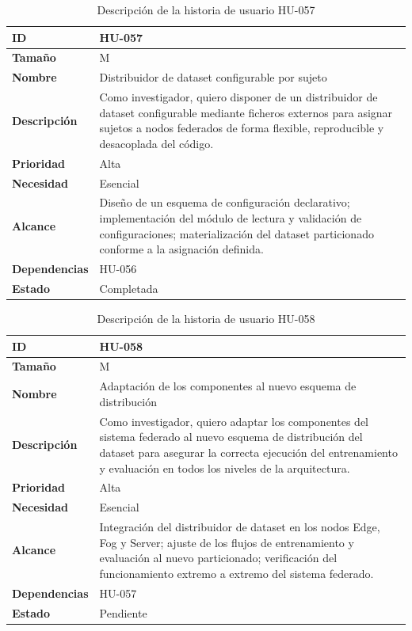 \documentclass{report}
\begin{document}
\begin{table}[H]
\centering
\caption{Descripción de la historia de usuario HU-057}
\label{tab:hu057}
\begin{tabular}{|l|p{12cm}|}
\hline
\textbf{ID} & HU-057 \\ \hline
\textbf{Tamaño} & M \\ \hline
\textbf{Nombre} & Distribuidor de dataset configurable por sujeto \\ \hline
\textbf{Descripción} &
Como investigador, quiero disponer de un distribuidor de dataset configurable mediante ficheros externos para asignar sujetos a nodos federados de forma flexible, reproducible y desacoplada del código. \\ \hline
\textbf{Prioridad} & Alta \\ \hline
\textbf{Necesidad} & Esencial \\ \hline
\textbf{Alcance} &
Diseño de un esquema de configuración declarativo; implementación del módulo de lectura y validación de configuraciones; materialización del dataset particionado conforme a la asignación definida. \\ \hline
\textbf{Dependencias} & HU-056 \\ \hline
\textbf{Estado} & Completada \\ \hline
\end{tabular}
\end{table}

\begin{table}[H]
\centering
\caption{Descripción de la historia de usuario HU-058}
\label{tab:hu058}
\begin{tabular}{|l|p{12cm}|}
\hline
\textbf{ID} & HU-058 \\ \hline
\textbf{Tamaño} & M \\ \hline
\textbf{Nombre} & Adaptación de los componentes al nuevo esquema de distribución \\ \hline
\textbf{Descripción} &
Como investigador, quiero adaptar los componentes del sistema federado al nuevo esquema de distribución del dataset para asegurar la correcta ejecución del entrenamiento y evaluación en todos los niveles de la arquitectura. \\ \hline
\textbf{Prioridad} & Alta \\ \hline
\textbf{Necesidad} & Esencial \\ \hline
\textbf{Alcance} &
Integración del distribuidor de dataset en los nodos Edge, Fog y Server; ajuste de los flujos de entrenamiento y evaluación al nuevo particionado; verificación del funcionamiento extremo a extremo del sistema federado. \\ \hline
\textbf{Dependencias} &
HU-057 \\ \hline
\textbf{Estado} & Pendiente \\ \hline
\end{tabular}
\end{table}
\end{document}
